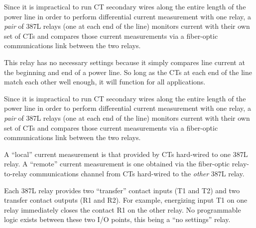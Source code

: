 Since it is impractical to run CT secondary wires along the entire length of the power line in order to perform differential current measurement with one relay, a {\it pair} of 387L relays (one at each end of the line) monitors current with their own set of CTs and compares those current measurements via a fiber-optic communications link between the two relays.







This relay has no necessary settings because it simply compares line current at the beginning and end of a power line.  So long as the CTs at each end of the line match each other well enough, it will function for all applications.

\vskip 10pt

Since it is impractical to run CT secondary wires along the entire length of the power line in order to perform differential current measurement with one relay, a {\it pair} of 387L relays (one at each end of the line) monitors current with their own set of CTs and compares those current measurements via a fiber-optic communications link between the two relays.

\vskip 10pt

A ``local'' current measurement is that provided by CTs hard-wired to one 387L relay.  A ``remote'' current measurement is one obtained via the fiber-optic relay-to-relay communications channel from CTs hard-wired to the {\it other} 387L relay.

\vskip 10pt

Each 387L relay provides two ``transfer'' contact inputs (T1 and T2) and two transfer contact outputs (R1 and R2).  For example, energizing input T1 on one relay immediately closes the contact R1 on the other relay.  No programmable logic exists between these two I/O points, this being a ``no settings'' relay.




